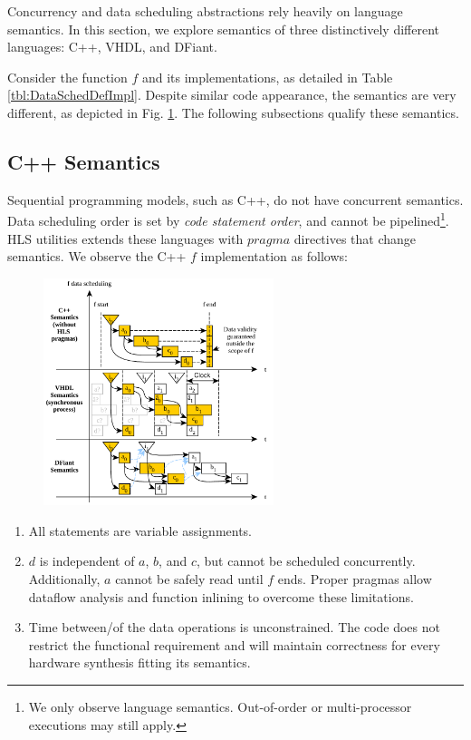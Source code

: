Concurrency and data scheduling abstractions rely heavily on language semantics. In this section, we explore semantics of three distinctively different languages: C++, VHDL, and DFiant. 

Consider the function $f$ and its implementations, as detailed in Table \ref{tbl:DataSchedDefImpl}. Despite similar code appearance, the semantics are very different, as depicted in Fig. \ref{fig:DataSchedGraph}. The following subsections qualify these semantics.


\subsection{C++ Semantics}
Sequential programming models, such as C++, do not have concurrent semantics. Data scheduling order is set by \textit{code statement order}, and cannot be pipelined\footnote{We only observe language semantics. Out-of-order or multi-processor executions may still apply.}. HLS utilities extends these languages with $pragma$ directives that change semantics. We observe the C++ $f$ implementation as follows:

\begin{figure}[t]
	\centering
	\includegraphics[width=0.6\textwidth]{graphics/DataScheduling.pdf}
	\label{fig:DataSchedGraph}
\end{figure}

\begin{enumerate}
	\item All statements are variable assignments.
	\item $d$ is independent of $a$, $b$, and $c$, but cannot be scheduled concurrently. Additionally, $a$ cannot be safely read until $f$ ends. Proper pragmas allow dataflow analysis and function inlining to overcome these limitations.
	\item Time between/of the data operations is unconstrained. The code does not restrict the functional requirement and will maintain correctness for every hardware synthesis fitting its semantics. 
\end{enumerate}  

